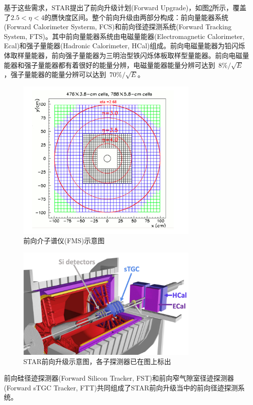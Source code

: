 基于这些需求，STAR提出了前向升级计划(Forward Upgrade)，如图\ref{fig:FWD}所示，覆盖了$ 2.5 < \eta < 4 $的赝快度区间。整个前向升级由两部分构成：前向量能器系统(Forward Calorimeter Systerm, FCS)和前向径迹探测系统(Forward Tracking System, FTS)。其中前向量能器系统由电磁量能器(Electromagnetic Calorimeter, Ecal)和强子量能器(Hadronic Calorimeter, HCal)组成。前向电磁量能器为铅闪烁体取样量能器，前向强子量能器为三明治型铁闪烁体板取样型量能器。前向电磁量能器和强子量能器都有着很好的能量分辨，电磁量能器能量分辨可达到~$8\%/\sqrt{E}$，强子量能器的能量分辨可以达到~$70\%/\sqrt{E}$。
\begin{figure}[htb]
    \begin{center}
    \includegraphics[width=0.8\textwidth,clip]{figures/Chapter3/FMS.png}
    \end{center}
    \caption[前向介子谱仪(FMS)示意图]{前向介子谱仪(FMS)示意图}
    \label{fig:FMS}
\end{figure}
\begin{figure}[htb]
    \begin{center}
    \includegraphics[width=0.8\textwidth,clip]{figures/Chapter3/FWD.png}
    \end{center}
    \caption[STAR前向升级示意图]{STAR前向升级示意图，各子探测器已在图上标出}
    \label{fig:FWD}
\end{figure}
前向硅径迹探测器(Forward Silicon Tracker, FST)和前向窄气隙室径迹探测器(Forward sTGC Tracker, FTT)共同组成了STAR前向升级当中的前向径迹探测系统。

